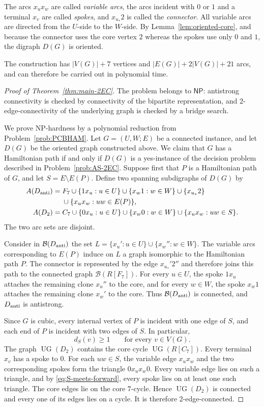 \documentclass[12pt]{article}
\theoremstyle{remark}
\newcommand{\UG}{\operatorname{UG}}
\newcommand{\cB}{\mathcal{B}}
\newcommand{\NP}{\mathsf{NP}}
\begin{document}
The arcs $x_ux_w$ are called \emph{variable arcs}, the arcs
incident with $0$ or $1$ and a terminal $x_v$ are called
\emph{spokes}, and $x_{u_*}2$ is called the \emph{connector}.  All variable arcs are directed from the $U$-side to the $W$-side. By Lemma~\ref{lem:oriented-core}, and because the connector uses the core vertex $2$ whereas the spokes use only $0$ and $1$, the
digraph $D(G)$ is oriented.

The construction has $|V(G)|+7$ vertices and
$|E(G)|+2|V(G)|+21$ arcs, and can therefore be carried out in polynomial time.

\begin{proof}[Proof of Theorem~\ref{thm:main-2EC}]
The problem belongs to $\NP$: antistrong connectivity is checked by connectivity of the bipartite representation, and 2-edge-connectivity of the underlying graph is checked by a bridge
search.

We prove NP-hardness by a polynomial reduction from
Problem~\ref{prob:PCBHAM}.  Let $G=(U,W;E)$ be a connected instance,
and let $D(G)$ be the oriented graph constructed above.  We claim that $G$ has a Hamiltonian path if and only if $D(G)$ is a yes-instance of the decision problem described in
Problem~\ref{prob:AS-2EC}.
Suppose first that $P$ is a Hamiltonian path of $G$, and let $S=E\setminus E(P)$.  Define two spanning subdigraphs of $D(G)$ by
\begin{align*}
 A(D_{\rm anti})={}&F_7
   \cup\{1x_u:u\in U\}
   \cup\{x_w1:w\in W\}
   \cup\{x_{u_*}2\}\\
   &\cup\{x_ux_w:uw\in E(P)\},\\
 A(D_2)={}&C_7
   \cup\{0x_u:u\in U\}
   \cup\{x_w0:w\in W\}
   \cup\{x_ux_w:uw\in S\}.
\end{align*}
The two arc sets are disjoint.

Consider in $\cB(D_{\rm anti})$ the set $L=\{x_u':u\in U\}\cup\{x_w'':w\in W\}$.
The variable arcs corresponding to $E(P)$ induce on $L$ a graph
isomorphic to the Hamiltonian path $P$.  The connector is represented
by the edge $x_{u_*}'2''$ and therefore joins this path to the
connected graph $\cB(R[F_7])$.  For every $u\in U$, the spoke $1x_u$
attaches the remaining clone $x_u''$ to the core, and for every
$w\in W$, the spoke $x_w1$ attaches the remaining clone $x_w'$ to the
core.  Thus $\cB(D_{\rm anti})$ is connected, and
$D_{\rm anti}$ is antistrong.

Since $G$ is cubic, every internal vertex of $P$ is incident with one
edge of $S$, and each end of $P$ is incident with two edges of $S$.
In particular,
\begin{equation}\label{eq:S-meets-forward}
   d_S(v)\ge 1\qquad\text{for every }v\in V(G).
\end{equation}
The graph $\UG(D_2)$ contains the core cycle $\UG(R[C_7])$.  Every terminal $x_v$ has a spoke to $0$.  For each $uw\in S$, the variable
edge $x_ux_w$ and the two corresponding spokes form the triangle $0x_ux_w0$.
Every variable edge lies on such a triangle, and by
\eqref{eq:S-meets-forward}, every spoke lies on at least one such
triangle.  The core edges lie on the core $7$-cycle.  Hence
$\UG(D_2)$ is connected and every one of its edges lies on a cycle.
It is therefore 2-edge-connected.


\end{proof}
\end{document}
